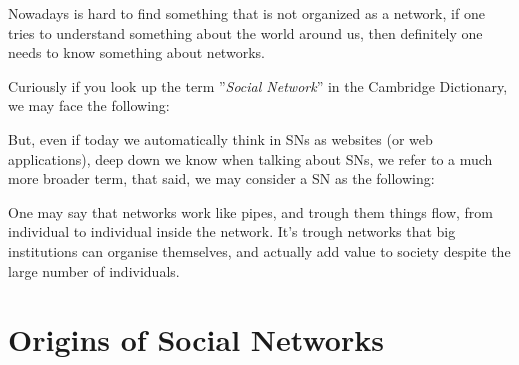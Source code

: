 
\indent \indent Nowadays is hard to find something that is not organized as a network, if one tries to understand something about the world around us, then definitely one needs to know something about networks.

Curiously if you look up the term ''\textit{Social Network}'' in the Cambridge Dictionary, we may face the following:

\hfill \break

\hypertarget{cambridge_dict_sn_org}{}

\hfill \break

But, even if today we automatically think in SNs as websites (or web applications), deep down we know when talking about SNs, we refer to a much more broader term, that said, we may consider a SN as the following:

\hfill \break

\hypertarget{webopedia_sn_defenition_org}{}

\hfill \break

One may say that networks work like pipes, and trough them things flow, from individual to individual inside the network. It's trough networks that big institutions can organise themselves, and actually add value to society despite the large number of individuals.

\section{Origins of Social Networks}

\hypertarget{sna_bible_org}{}

